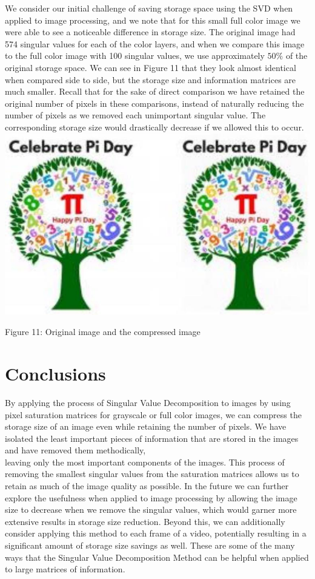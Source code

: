 \documentclass[10pt]{article}
\begin{document}
We consider our initial challenge of saving storage space using the SVD when applied to image processing, and we note that for this small full color image we were able to see a noticeable difference in storage size. The original image had 574 singular values for each of the color layers, and when we compare this image to the full color image with 100 singular values, we use approximately $50 \%$ of the original storage space. We can see in Figure 11 that they look almost identical when compared side to side, but the storage size and information matrices are much smaller. Recall that for the sake of direct comparison we have retained the original number of pixels in these comparisons, instead of naturally reducing the number of pixels as we removed each unimportant singular value. The corresponding storage size would drastically decrease if we allowed this to occur.\\
\includegraphics[max width=\textwidth, center]{2025_04_09_7d70d965b908bc4c1892g-7}

Figure 11: Original image and the compressed image

\section*{Conclusions}
By applying the process of Singular Value Decomposition to images by using pixel saturation matrices for grayscale or full color images, we can compress the storage size of an image even while retaining the number of pixels. We have isolated the least important pieces of information that are stored in the images and have removed them methodically,\\
leaving only the most important components of the images. This process of removing the smallest singular values from the saturation matrices allows us to retain as much of the image quality as possible. In the future we can further explore the usefulness when applied to image processing by allowing the image size to decrease when we remove the singular values, which would garner more extensive results in storage size reduction. Beyond this, we can additionally consider applying this method to each frame of a video, potentially resulting in a significant amount of storage size savings as well. These are some of the many ways that the Singular Value Decomposition Method can be helpful when applied to large matrices of information.
\end{document}

